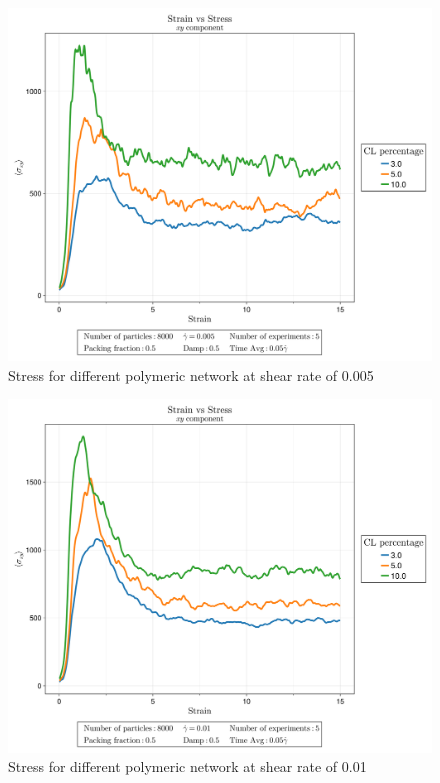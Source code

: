\begin{figure}[ht!]
    \centering
    \includegraphics[width=\textwidth]{figs/ComputaitonalResults/dgamma5Stress.png}
    \caption{Stress for different polymeric network at shear rate of \num{0.005}}
\end{figure}

\begin{figure}[ht!]
    \centering
    \includegraphics[width=\textwidth]{figs/ComputaitonalResults/dgamma10Stress.png}
    \caption{Stress for different polymeric network at shear rate of \num{0.01}}
\end{figure}


